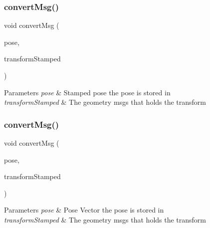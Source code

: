 \subsubsection{\texorpdfstring{convert\+Msg()}{convertMsg()}\hspace{0.1cm}{\footnotesize\ttfamily [11/14]}}
{\footnotesize\ttfamily void convert\+Msg (\begin{DoxyParamCaption}\item[{geometry\+\_\+msgs\+::\+Pose\+Stamped \&}]{pose,  }\item[{geometry\+\_\+msgs\+::\+Transform\+Stamped \&}]{transform\+Stamped }\end{DoxyParamCaption})\hspace{0.3cm}{\ttfamily [inline]}}


\begin{DoxyParams}{Parameters}
{\em pose} & Stamped pose the pose is stored in \\
\hline
{\em transform\+Stamped} & The geometry msgs that holds the transform \\
\hline
\end{DoxyParams}
\mbox{\label{group__MultiRobotController_ga21e894dfe1e1216355db06776a630b09}} 
\subsubsection{\texorpdfstring{convert\+Msg()}{convertMsg()}\hspace{0.1cm}{\footnotesize\ttfamily [12/14]}}
{\footnotesize\ttfamily void convert\+Msg (\begin{DoxyParamCaption}\item[{Eigen\+::\+Matrix$<$ double, 7, 1 $>$ \&}]{pose,  }\item[{geometry\+\_\+msgs\+::\+Transform\+Stamped \&}]{transform\+Stamped }\end{DoxyParamCaption})\hspace{0.3cm}{\ttfamily [inline]}}


\begin{DoxyParams}{Parameters}
{\em pose} & Pose Vector the pose is stored in \\
\hline
{\em transform\+Stamped} & The geometry msgs that holds the transform \\
\hline
\end{DoxyParams}
\mbox{\label{group__MultiRobotController_ga27bedbf17c4aa6e228239ef1f1009e2b}} 
